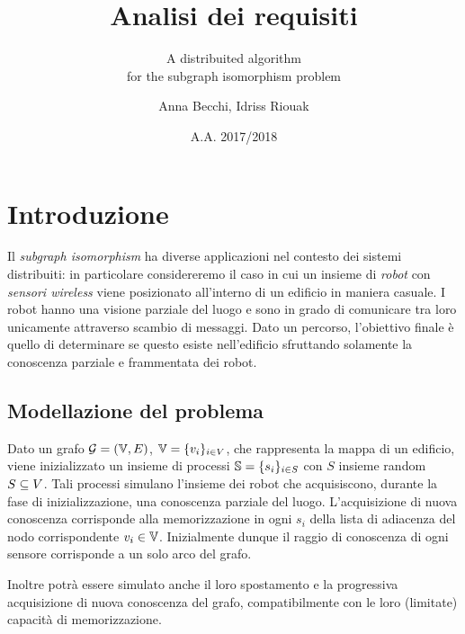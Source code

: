 \documentclass{llncs}
\subtitle{A distribuited algorithm\\for the subgraph isomorphism problem}
\title{Analisi dei requisiti}
\author{Anna Becchi, Idriss Riouak}
\institute{Laurea Magistrale in Informatica\\Universit\`a di Udine, Italy}
\date{A.A. 2017/2018}
\begin{document}
\maketitle

\section{Introduzione}
Il \emph{subgraph isomorphism} ha diverse applicazioni nel contesto
dei sistemi distribuiti: in particolare considereremo il caso in cui un insieme
di \emph{robot} con \emph{sensori wireless} viene posizionato all'interno di
un edificio in maniera casuale. I robot hanno una visione parziale del luogo
e sono in grado di comunicare tra loro unicamente attraverso scambio di messaggi.
Dato un percorso, l'obiettivo finale è quello di determinare se questo esiste
nell'edificio sfruttando solamente la conoscenza parziale e frammentata dei robot.

\subsection{Modellazione del problema}
Dato un grafo $\mathcal{G} = ( \mathbb{V}, E)$, $\mathbb{V} = \{v_i\}_{i \in V}$,
che rappresenta la mappa di un edificio, viene inizializzato un
insieme di processi $\mathbb{S} = \{s_i \}_{i \in S}$ con $S$ insieme
random $S \subseteq V$.
Tali processi simulano l'insieme dei robot che
acquisiscono, durante la fase di inizializzazione, una conoscenza
parziale del luogo. L'acquisizione di nuova conoscenza corrisponde
alla memorizzazione in ogni $s_i$ della lista di adiacenza del nodo
corrispondente $v_i \in \mathbb{V}$.
Inizialmente dunque il raggio di conoscenza di ogni sensore corrisponde
a un solo arco del grafo.

Inoltre potrà essere simulato anche il loro spostamento e la progressiva
acquisizione di nuova conoscenza del grafo, compatibilmente con le
loro (limitate) capacità di memorizzazione.
\end{document}
